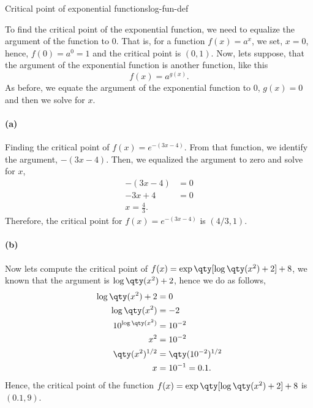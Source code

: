 \documentclass[../main.tex]{subfiles}
\begin{document}
\begin{example}{Critical point of exponential functions}{log-fun-def}

To find the critical point of the exponential function, we need to equalize the argument of the function to $0$.
That is, for a function $f(x) = a^x$, we set, $x=0$, hence, $f(0)=a^{0}=1$ and the critical point is $(0,1)$.
Now, lets suppose, that the argument of the exponential function is another function, like this \[f(x)=a^{g(x)}.\]
As before, we equate the argument of the exponential function to $0$, $g(x)=0$ and then we solve for $x$.

\paragraph{(a)} Finding the critical point of $f(x)=e^{-(3x-4)}$.
From that function, we identify the argument, $-(3x-4)$.
Then, we equalized the argument to zero and solve for $x$,
\begin{align*}
    -(3x-4) &= 0 \\
    -3x+4 &= 0 \\
    x = \frac{4}{3}.
\end{align*}
Therefore, the critical point for $f(x)=e^{-(3x-4)}$ is $(4/3,1)$.

\paragraph{(b)} Now lets compute the critical point of $f(x) = \exp\qty[\log\qty(x^2)+2]+8$,
we known that the argument is $\log\qty(x^2)+2$, hence we do as follows,
\begin{align*}
    \log\qty(x^2)+2 &= 0 \\
    \log\qty(x^2) &= -2 \\
    10^{\log\qty(x^2)} &= 10^{-2} \\
    x^2 &= 10^{-2} \\
    \qty(x^2)^{1/2} &= \qty(10^{-2})^{1/2} \\
    x &= 10^{-1} = 0.1.\\
\end{align*}
Hence, the critical point of the function $f(x) = \exp\qty[\log\qty(x^2)+2]+8$ is $(0.1,9)$.

\end{example}
\end{document}
